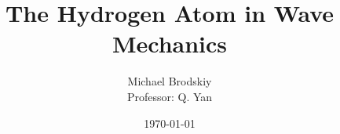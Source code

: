 


\title{The Hydrogen Atom in Wave Mechanics}
\date{\today}
\author{Michael Brodskiy\\ \small Professor: Q. Yan}



\maketitle

\newpage

\tableofcontents

\newpage

